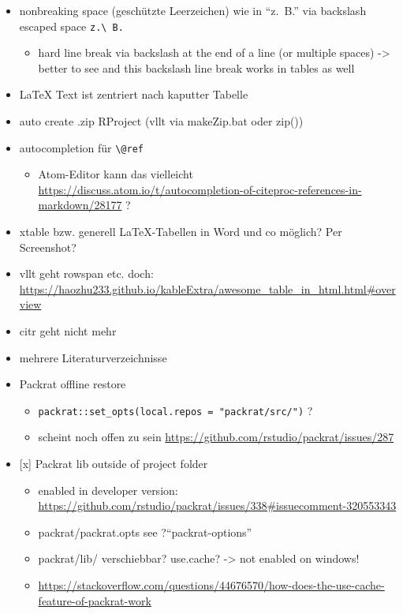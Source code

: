 \documentclass[]{book}
\providecommand{\tightlist}{%
  \setlength{\itemsep}{0pt}\setlength{\parskip}{0pt}}
\theoremstyle{definition}
\theoremstyle{definition}
\theoremstyle{remark}
\begin{document}
\begin{itemize}
\tightlist
\item
  nonbreaking space (geschützte Leerzeichen) wie in ``z.~B.'' via
  backslash escaped space \texttt{z.\textbackslash{}\ B.}

  \begin{itemize}
  \tightlist
  \item
    hard line break via backslash at the end of a line (or multiple
    spaces) -\textgreater{} better to see and this backslash line break
    works in tables as well
  \end{itemize}
\item
  LaTeX Text ist zentriert nach kaputter Tabelle
\item
  auto create .zip RProject (vllt via makeZip.bat oder zip())
\item
  autocompletion für \texttt{\textbackslash{}@ref}

  \begin{itemize}
  \tightlist
  \item
    Atom-Editor kann das vielleicht
    \url{https://discuss.atom.io/t/autocompletion-of-citeproc-references-in-markdown/28177}
    ?
  \end{itemize}
\item
  xtable bzw. generell LaTeX-Tabellen in Word und co möglich? Per
  Screenshot?
\item
  vllt geht rowspan etc. doch:
  \url{https://haozhu233.github.io/kableExtra/awesome_table_in_html.html\#overview}
\item
  citr geht nicht mehr
\item
  mehrere Literaturverzeichnisse
\item
  Packrat offline restore

  \begin{itemize}
  \tightlist
  \item
    \texttt{packrat::set\_opts(local.repos\ =\ "packrat/src/")} ?
  \item
    scheint noch offen zu sein
    \url{https://github.com/rstudio/packrat/issues/287}
  \end{itemize}
\item
  {[}x{]} Packrat lib outside of project folder

  \begin{itemize}
  \tightlist
  \item
    enabled in developer version:
    \url{https://github.com/rstudio/packrat/issues/338\#issuecomment-320553343}
  \item
    packrat/packrat.opts see ?``packrat-options''
  \item
    packrat/lib/ verschiebbar? use.cache? -\textgreater{} not enabled on
    windows!
  \item
    \url{https://stackoverflow.com/questions/44676570/how-does-the-use-cache-feature-of-packrat-work}


\end{itemize}
\end{itemize}
\end{document}
